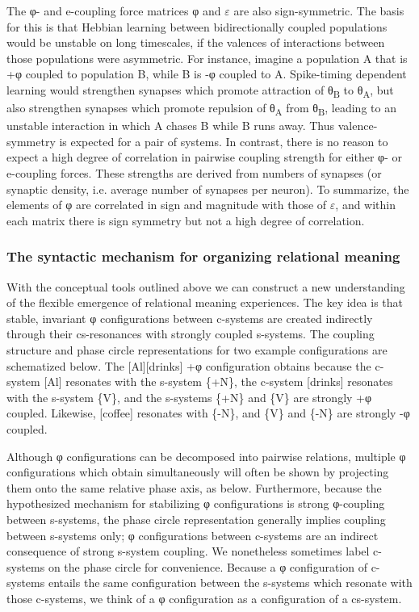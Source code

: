   The φ- and e-coupling force matrices φ and $\varepsilon $ are also sign-symmetric. The basis for this is that Hebbian learning between bidirectionally coupled populations would be unstable on long timescales, if the valences of interactions between those populations were asymmetric. For instance, imagine a population A that is +φ coupled to population B, while B is -φ coupled to A. Spike-timing dependent learning would strengthen synapses which promote attraction of θ\textsubscript{B} to θ\textsubscript{A}, but also strengthen synapses which promote repulsion of θ\textsubscript{A} from θ\textsubscript{B}, leading to an unstable interaction in which A chases B while B runs away. Thus valence-symmetry is expected for a pair of systems. In contrast, there is no reason to expect a high degree of correlation in pairwise coupling strength for either φ- or e-coupling forces. These strengths are derived from numbers of synapses (or synaptic density, i.e. average number of synapses per neuron). To summarize, the elements of φ are correlated in sign and magnitude with those of $\varepsilon $, and within each matrix there is sign symmetry but not a high degree of correlation.

\subsubsection{The syntactic mechanism for organizing relational meaning}

With the conceptual tools outlined above we can construct a new understanding of the flexible emergence of relational meaning experiences. The key idea is that stable, invariant φ configurations between c-systems are created indirectly through their cs-resonances with strongly coupled s-systems. The coupling structure and phase circle representations for two example configurations are schematized below. The [Al][drinks] +φ configuration obtains because the c-system [Al] resonates with the s-system \{+N\}, the c-system [drinks] resonates with the s-system \{V\}, and the s-systems \{+N\} and \{V\} are strongly +φ coupled. Likewise, [coffee] resonates with \{-N\}, and \{V\} and \{-N\} are strongly -φ coupled.

  Although φ configurations can be decomposed into pairwise relations, multiple φ configurations which obtain simultaneously will often be shown by projecting them onto the same relative phase axis, as below. Furthermore, because the hypothesized mechanism for stabilizing φ configurations is strong φ-coupling between s-systems, the phase circle representation generally implies coupling between s-systems only; φ configurations between c-systems are an indirect consequence of strong s-system coupling. We nonetheless sometimes label c-systems on the phase circle for convenience. Because a φ configuration of c-systems entails the same configuration between the s-systems which resonate with those c-systems, we think of a φ configuration as a configuration of a cs-system. 

